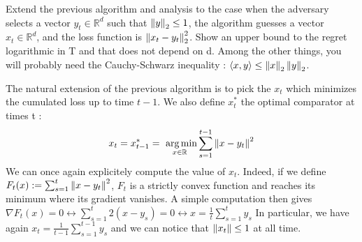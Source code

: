 \begin{exercise}[]{}
	Extend the previous algorithm and analysis to the case when the adversary selects a vector $ y_t \in  \mathbb{R}^d $ such that $ \left\|y\right\|_2 \leq 1$, the algorithm guesses a vector $ x_t \in \mathbb{R}^d $, and the loss function is $ \left\|x_t-y_t\right\|_2^2 $. Show an upper bound to the regret logarithmic in T and that does not depend on d. Among the other things, you will probably need the Cauchy-Schwarz inequality : $ \langle x,y\rangle \leq  \left\|x\right\|_2 \left\|y\right\|_2 $.
\end{exercise}

\begin{solution}
	The natural extension of the previous algorithm is to pick the $ x_t $ which minimizes the cumulated loss up to time $ t-1 $. We also define $ x_t^{*} $ the optimal comparator at times t :
\begin{equation*}
	x_t = x_{t-1}^{*} = \mathop{\mbox{ arg\,min}}_{x\in \mathbb{R}}\sum_{s=1}^{t-1} \left\|x-y_t\right\|^2
\end{equation*}
We can once again explicitely compute the value of $ x_t $. Indeed, if we define $ F_t(x) := \sum_{s=1}^{t} \left\|x-y_t\right\|^2 $, $ F_t $ is a strictly convex function and reaches its minimum where its gradient vanishes. A simple computation then gives $ \nabla F_t(x) = 0 \leftrightarrow \sum_{s=1}^{t}2(x-y_s) = 0 \leftrightarrow x = \frac{1}{t}\sum_{s=1}^{t}y_s $
In particular, we have again $ x_t = \frac{1}{t-1}\sum_{s=1}^{t-1}y_s $ and we can notice that $ \left\|x_t\right\| \leq 1 $ at all time.


\end{solution}
